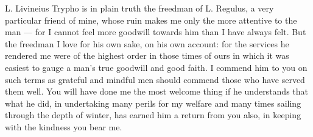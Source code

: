 

 L. Livineius Trypho is in plain truth the freedman of L. Regulus, a very particular friend of mine, whose ruin makes me only the more attentive to the man --- for I cannot feel more goodwill towards him than I have always felt. But the freedman I love for his own sake, on his own account: for the services he rendered me were of the highest order in those times of ours in which it was easiest to gauge a man's true goodwill and good faith. I commend him to you on such terms as grateful and mindful men should commend those who have served them well. You will have done me the most welcome thing if he understands that what he did, in undertaking many perils for my welfare and many times sailing through the depth of winter, has earned him a return from you also, in keeping with the kindness you bear me.
